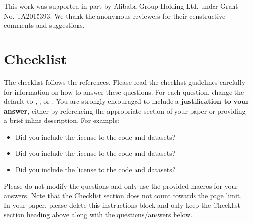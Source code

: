 \documentclass{article}
\begin{document}
\begin{ack}
This work was supported in part by Alibaba Group Holding Ltd. under Grant No. TA2015393. We thank the anonymous reviewers for their constructive comments and suggestions.
\end{ack}

\def\bibfont{\fontsize{8.3}{10.3}\selectfont}
{\small


}





\newpage

\section*{Checklist}


The checklist follows the references.  Please
read the checklist guidelines carefully for information on how to answer these
questions.  For each question, change the default \answerTODO{} to \answerYes{},
\answerNo{}, or \answerNA{}.  You are strongly encouraged to include a {\bf
justification to your answer}, either by referencing the appropriate section of
your paper or providing a brief inline description.  For example:
\begin{itemize}
  \item Did you include the license to the code and datasets? 
  \item Did you include the license to the code and datasets? 
  \item Did you include the license to the code and datasets? \answerNA{}
\end{itemize}
Please do not modify the questions and only use the provided macros for your
answers.  Note that the Checklist section does not count towards the page
limit.  In your paper, please delete this instructions block and only keep the
Checklist section heading above along with the questions/answers below.
\end{document}
